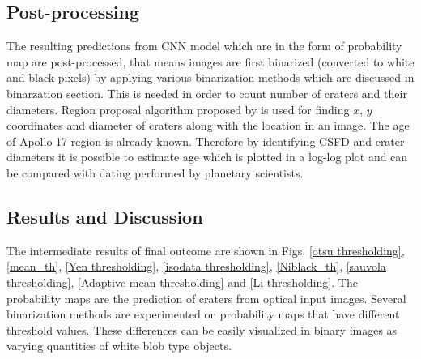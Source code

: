 \documentclass[11pt]{article}
\begin{document}
\subsection{Post-processing}
The resulting predictions from CNN model which are in the form of probability map are post-processed, that means images are first binarized (converted to white and black pixels) by applying various binarization methods which are discussed in binarzation section. This is needed in order to count number of craters and their diameters. Region proposal algorithm proposed by \cite{burger2009principles} is used for finding $x$, $y$ coordinates and diameter of craters along with the location in an image. The age of Apollo 17 region is already known. Therefore by identifying CSFD and crater diameters it is possible to estimate age which is plotted in a log-log plot and can be compared with dating performed by planetary scientists.

\subsection{Results and Discussion}
The intermediate results of final outcome are shown in Figs. \ref{otsu thresholding}, \ref{mean_th}, \ref{Yen thresholding}, \ref{isodata thresholding}, \ref{Niblack_th}, \ref{sauvola thresholding}, \ref{Adaptive mean thresholding} and \ref{Li thresholding}. The probability maps are the prediction of craters from optical input images. Several binarization methods are experimented on probability maps that have different threshold values. These differences can be easily visualized in binary images as varying quantities of white blob type objects.  
\end{document}
